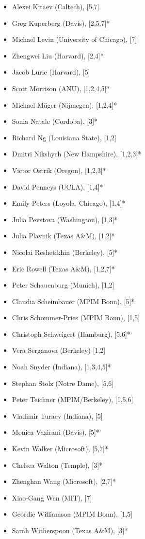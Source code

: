 \documentclass[12pt]{article}
\begin{document}
\begin{multicols}{2}
\begin{itemize}
\item Alexei Kitaev (Caltech), [5,7]
\item Greg Kuperberg (Davis), [2,5,7]*
\item Michael Levin (University of Chicago), [7]
\item Zhengwei Liu (Harvard), [2,4]*
\item Jacob Lurie (Harvard), [5]
\item Scott Morrison (ANU), [1,2,4,5]*
\item Michael M\"uger (Nijmegen), [1,2,4]*
\item Sonia Natale (Cordoba), [3]*
\item Richard Ng (Louisiana State), [1,2]
\item Dmitri Nikshych (New Hampshire), [1,2,3]*
\item Victor Ostrik (Oregon), [1,2,3]*
\item David Penneys (UCLA), [1,4]*
\item Emily Peters (Loyola, Chicago), [1,4]*
\item Julia Pevstova (Washington), [1,3]*
\item Julia Plavnik (Texas A\&M), [1,2]*
\item Nicolai Reshetikhin (Berkeley), [5]*
\item Eric Rowell (Texas A\&M), [1,2,7]*
\item Peter Schauenburg (Munich), [1,2]
\item Claudia Scheimbauer (MPIM Bonn), [5]*
\item Chris Schommer-Pries (MPIM Bonn), [1,5]
\item Christoph Schweigert (Hamburg), [5,6]*
\item Vera Serganova (Berkeley) [1,2]
\item Noah Snyder (Indiana), [1,3,4,5]*
\item Stephan Stolz (Notre Dame), [5,6]
\item Peter Teichner (MPIM/Berkeley), [1,5,6]
\item Vladimir Turaev (Indiana), [5]
\item Monica Vazirani (Davis), [5]*
\item Kevin Walker (Microsoft), [5,7]*
\item Chelsea Walton (Temple), [3]*
\item Zhenghan Wang (Microsoft), [2,7]*
\item Xiao-Gang Wen (MIT), [7]
\item Geordie Williamson (MPIM Bonn), [1,5]
\item Sarah Witherspoon (Texas A\&M), [3]*
\end{itemize}
\end{multicols}
\end{document}
